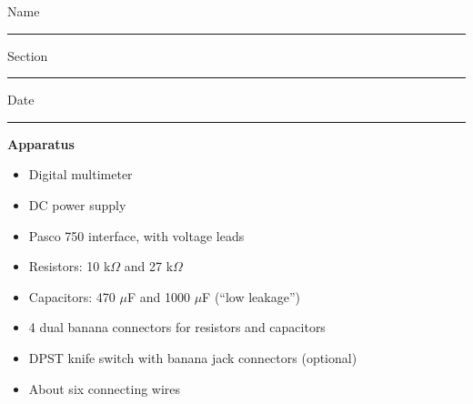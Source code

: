 Name \rule{2.0in}{0.1pt}\hfill{}Section \rule{1.0in}{0.1pt}\hfill{}Date
\rule{1.0in}{0.1pt}

\vspace{0.1in}
\textbf{Apparatus} 
\begin{itemize}%
\setlength\itemsep{-4pt}
\setlength\topsep{-6pt}
\setlength\partopsep{-6pt}
\vspace{-0.2in}  %
\item Digital multimeter 
\item DC power supply 
\item Pasco 750 interface, with voltage leads
\item Resistors: 10 k$\Omega$ and 27 k$\Omega$
\item Capacitors: 470 $\mu$F and 1000 $\mu$F (``low leakage'')
\item 4 dual banana connectors for resistors and capacitors
\item DPST knife switch with banana jack connectors (optional)
\item About six connecting wires
\end{itemize}

